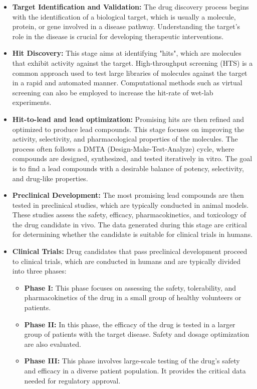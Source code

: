 \begin{itemize}
    \item \textbf{Target Identification and Validation:} The drug discovery process begins with the
          identification of a biological target, which is usually a molecule, protein, or gene involved
          in a disease pathway. Understanding the target's role in the disease is crucial for developing
          therapeutic interventions.

    \item \textbf{Hit Discovery:} This stage aims at identifying "hits", which are molecules that
          exhibit activity against the target. High-throughput screening (HTS) is a common approach
          used to test large libraries of molecules against the target in a rapid and automated manner.
          Computational methods such as virtual screening can also be employed to increase the hit-rate
          of wet-lab experiments.

    \item \textbf{Hit-to-lead and lead optimization:} Promising hits are then refined and optimized to produce lead
          compounds. This stage focuses on improving the activity, selectivity, and pharmacological
          properties of the molecules. The process often follows a DMTA
          (Design-Make-Test-Analyze) cycle, where compounds are designed, synthesized, and tested
          iteratively in vitro. The goal is to find a lead compounds with a desirable balance of potency,
          selectivity, and drug-like properties.

    \item \textbf{Preclinical Development:} The most promising lead compounds are then tested in
          preclinical studies, which are typically conducted in animal models. These studies assess the
          safety, efficacy, pharmacokinetics, and toxicology of the drug candidate in vivo. The data
          generated during this stage are critical for determining whether the candidate is suitable for
          clinical trials in humans.

    \item \textbf{Clinical Trials:} Drug candidates that pass preclinical development proceed to
          clinical trials, which are conducted in humans and are typically divided into three phases:
          \begin{itemize}
              \item \textbf{Phase I:} This phase focuses on assessing the safety, tolerability, and
                    pharmacokinetics of the drug in a small group of healthy volunteers or patients.
              \item \textbf{Phase II:} In this phase, the efficacy of the drug is tested in a larger
                    group of patients with the target disease. Safety and dosage optimization are also
                    evaluated.
              \item \textbf{Phase III:} This phase involves large-scale testing of the drug’s safety
                    and efficacy in a diverse patient population. It provides the critical data needed for
                    regulatory approval.
          \end{itemize}


\end{itemize}
